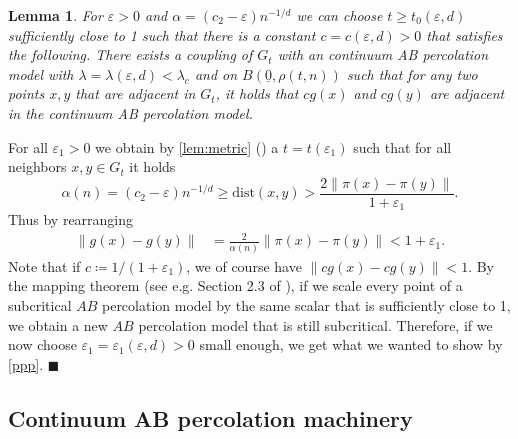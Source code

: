 \documentclass[11pt]{article}%
\newenvironment{proof}{\vspace{1ex}\noindent{\bf Proof.}}{\hspace*{\fill}$\blacksquare$\vspace{1ex}}
\newtheorem{lemma}[lemma]{Lemma}
\newcommand{\norm}[1]{\ensuremath{\left\|#1\right\|}}
\newcommand{\eps}{\varepsilon}
\newcommand{\dists}{{\mathrm{dist}}}
\newcommand{\typ}{\underline{0}}
\newcommand*{\rom}[1]{\romannumeral #1\relax}
\begin{document}
\begin{lemma}\label{coupleab2}
	For $ \eps>0 $ and $\alpha=(c_2-\eps)n^{-1/d}$ we can choose $ t\geq t_0(\eps,d) $ sufficiently close to 1 such that there is a constant $c=c(\eps,d)>0$ that satisfies the following. There exists a coupling of $ G_t $ with an continuum AB percolation model with $ \lambda=\lambda(\eps,d) <\lambda_c $ and 
	on $ B(\typ,\rho(t,n)) $ such that for any two points $ x,y $ that are adjacent in $ G_t $, it holds that  $ cg(x)$ and $cg(y) $ are adjacent in the continuum AB percolation model.
\end{lemma}
\begin{proof}
	For all $ \eps_1>0 $ we obtain by \cref{lem:metric} (\rom{2}) a $ t=t(\eps_1) $ such that for all neighbors $ x,y \in G_t$ it holds
	\begin{equation*}
		\alpha(n)=(c_2-\eps)n^{-1/d}\geq \dists(x,y)> \frac{2\norm{\pi(x)-\pi(y)} }{1+\eps_1}.
	\end{equation*}
	Thus by rearranging
	\begin{equation*}
		\begin{split}
			\norm{g(x)-g(y)}&=\frac{2}{\alpha(n)}\norm{\pi(x)-\pi(y)}< {1+\eps_1}.
		\end{split}
	\end{equation*}
    Note that if $c\coloneqq 1/(1+\eps_1)$, we of course have $\norm{cg(x)-cg(y)}<1$. By the mapping theorem (see e.g. Section 2.3 of \cite{Kingmanboek}), if we scale every point of a subcritical $AB$ percolation model by the same scalar that is sufficiently close to 1, we obtain a new $AB$ percolation model that is still subcritical. Therefore, if we now choose $ \eps_1=\eps_1(\eps,d)>0 $ small enough, we get what we wanted to show by \cref{ppp}.
\end{proof}



\subsection{Continuum AB percolation machinery}
\end{document}
